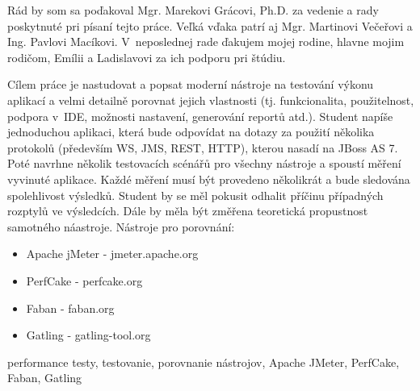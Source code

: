 \documentclass[12pt,oneside,final]{fithesis-utf8}
\begin{document}
\FrontMatter
\ThesisTitlePage

\begin{ThesisDeclaration}
\DeclarationText
\AdvisorName
\end{ThesisDeclaration}

\begin{ThesisThanks}

Rád by som sa poďakoval Mgr. Marekovi Grácovi, Ph.D.	za vedenie a rady poskytnuté pri písaní tejto práce. Veľká vďaka patrí aj Mgr. Martinovi Večeřovi a Ing. Pavlovi Macíkovi. V~neposlednej rade ďakujem mojej rodine, hlavne mojim rodičom, Emílii a Ladislavovi za ich podporu pri štúdiu.

\end{ThesisThanks}

\begin{ThesisAbstract}
 Cílem práce je nastudovat a popsat moderní nástroje na testování výkonu aplikací a velmi detailně porovnat jejich vlastnosti (tj. funkcionalita, použitelnost, podpora v~IDE, možnosti nastavení, generování reportů atd.). Student napíše jednoduchou aplikaci, která bude odpovídat na dotazy za použití několika protokolů (především WS, JMS, REST, HTTP), kterou nasadí na JBoss AS 7. Poté navrhne několik testovacích scénářů pro všechny nástroje a spoustí měření vyvinuté aplikace. Každé měření musí být provedeno několikrát a bude sledována spolehlivost výsledků. Student by se měl pokusit odhalit příčinu případných rozptylů ve výsledcích. Dále by měla být změřena teoretická propustnost samotného náastroje.
\newline \newline
Nástroje pro porovnání: 
\begin{itemize}

    \item Apache jMeter - jmeter.apache.org
    \item PerfCake - perfcake.org
    \item Faban - faban.org
    \item Gatling - gatling-tool.org

\end{itemize}
\end{ThesisAbstract}

\begin{ThesisKeyWords}
performance testy, testovanie, porovnanie nástrojov, Apache JMeter, PerfCake, Faban, Gatling
\end{ThesisKeyWords}

\tableofcontents
\MainMatter
\end{document}

